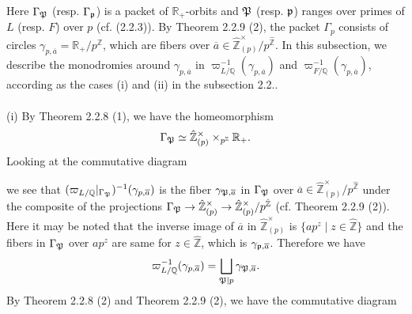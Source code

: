 \documentclass[12pt, leqno]{article}
\begin{document}
Here $\Gamma_{\frak{P}}$ (resp. $\Gamma_{\frak{p}}$) is a packet of $\mathbb{R}_+$-orbits and $\frak{P}$ (resp. $\frak{p}$) ranges over primes of $L$ (resp. $F$) over $p$ (cf. (2.2.3)). By Theorem 2.2.9 (2), the packet  $\Gamma_p$ consists of circles $\gamma_{p,  \overline{a}} = \mathbb{R}_+/p^{\mathbb{Z}}$, which are fibers over $\overline{a} \in \hat{\mathbb{Z}}_{(p)}^{\times}/p^{\hat{\mathbb{Z}}}$. In this subsection, we describe the monodromies around $\gamma_{p, \overline{a}}$ in $\varpi_{L/\mathbb{Q}}^{-1}(\gamma_{p, \overline{a}})$ and $\varpi_{F/\mathbb{Q}}^{-1}(\gamma_{p, \overline{a}})$, according as the cases (i) and (ii) in the subsection 2.2..  \\
\\
(i)  By Theorem 2.2.8 (1), we have the homeomorphism
$$ \Gamma_{\frak{P}} \simeq \hat{\mathbb{Z}}_{(p)}^{\times} \times_{p^{\mathbb{Z}}} \mathbb{R}_+.$$
Looking at the commutative  diagram
\begin{center}
\end{center}
we see that $(\varpi_{L/\mathbb{Q}}|_{\Gamma_{\frak{P}}})^{-1}(\gamma_{p, \overline{a}})$ is the fiber $\gamma_{\frak{P}, \overline{a}}$ in $\Gamma_{\frak{P}}$ over $\overline{a} \in \hat{\mathbb{Z}}_{(p)}^{\times}/p^{\hat{\mathbb{Z}}}$ under the composite of the projections
 $\Gamma_{\frak{P}} \rightarrow \hat{\mathbb{Z}}_{(p)}^{\times} \rightarrow \hat{\mathbb{Z}}_{(p)}^{\times}/p^{\hat{\mathbb{Z}}}$ (cf. Theorem 2.2.9 (2)). Here it may be noted  that the inverse image of $\overline{a}$ in $\hat{\mathbb{Z}}_{(p)}^{\times}$ is $\{ ap^z \mid z \in \hat{\mathbb{Z}}\}$ and the fibers in $\Gamma_{\frak{P}}$ over $ap^z$  are  same 
for $z  \in \hat{\mathbb{Z}}$, which is $\gamma_{\frak{p}, \overline{a}}$.
Therefore we have 
$$ \varpi_{L/\mathbb{Q}}^{-1}(\gamma_{p, \overline{a}}) = \bigsqcup_{\frak{P} \mid p} \gamma_{\frak{P}, \overline{a}}.$$
By Theorem 2.2.8 (2) and Theorem 2.2.9 (2), we have the commutative diagram
\end{document}
